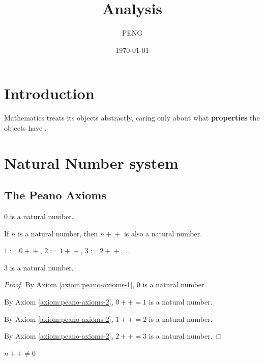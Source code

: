 \documentclass{article}
\title{Analysis}
\author{PENG}
\date{\today}
\newcommand{\pp}{\!+\!+}
\begin{document}
\maketitle
\tableofcontents

\section{Introduction}
Mathematics treats its objects abstractly, caring only about what \textbf{properties} the objects have \cite{TAO_2022_ANALYSIS_1}.

\section{Natural Number system}
\subsection{The Peano Axioms}
\begin{axiom}
    \label{axiom:peano-axioms-1}
    0 is a natural number.
\end{axiom}

\begin{axiom}
    \label{axiom:peano-axioms-2}
    If $n$ is a natural number, then $n\pp$ is also a natural number.
\end{axiom}

\begin{definition}
    \label{def:nat}
    $1 := 0\pp$, $2 := 1\pp$, $3 := 2\pp$, $\dots$
\end{definition}

\begin{proposition}
    \label{prop:3-is-nat}
    3 is a natural number.
\end{proposition}

\begin{proof}
    By Axiom \ref{axiom:peano-axioms-1}, 0 is a natural number.

    By Axiom \ref{axiom:peano-axioms-2}, $0\pp = 1$ is a natural number.

    By Axiom \ref{axiom:peano-axioms-2}, $1\pp = 2$ is a natural number.

    By Axiom \ref{axiom:peano-axioms-2}, $2\pp = 3$ is a natural number.
\end{proof}

\begin{axiom}
    \label{axiom:peano-axioms-3}
    $n\pp \neq 0$
\end{axiom}
\end{document}
